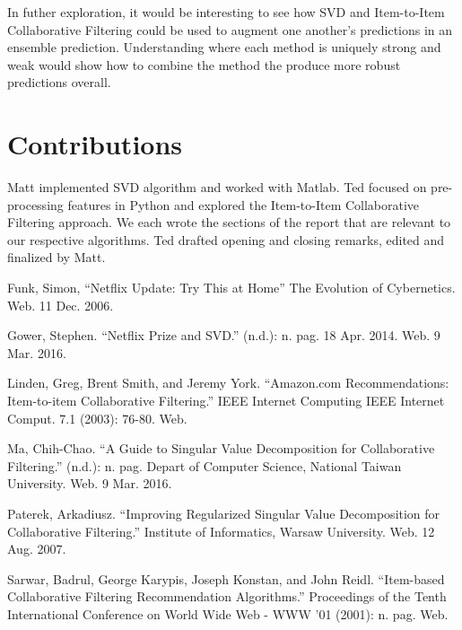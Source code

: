 \documentclass[12pt]{article}
\begin{document}
In futher exploration, it would be interesting to see how SVD and Item-to-Item Collaborative Filtering could be used to augment one another's predictions in an ensemble prediction. Understanding where each method is uniquely strong and weak would show how to combine the method the produce more robust predictions overall.

\section{Contributions}
Matt implemented SVD algorithm and worked with Matlab. Ted focused on pre-processing features in Python and explored the Item-to-Item Collaborative Filtering approach. We each wrote the sections of the report that are relevant to our respective algorithms. Ted drafted opening and closing remarks, edited and finalized by Matt.

\newpage
\begin{thebibliography}{9}

Funk, Simon, ``Netflix Update: Try This at Home'' The Evolution of Cybernetics. Web. 11 Dec. 2006.

Gower, Stephen. ``Netflix Prize and SVD.'' (n.d.): n. pag. 18 Apr. 2014. Web. 9 Mar. 2016.

Linden, Greg, Brent Smith, and Jeremy York. ``Amazon.com Recommendations: Item-to-item Collaborative Filtering.'' IEEE Internet Computing IEEE Internet Comput. 7.1 (2003): 76-80. Web.

Ma, Chih-Chao. ``A Guide to Singular Value Decomposition for Collaborative Filtering.'' (n.d.): n. pag. Depart of Computer Science, National Taiwan University. Web. 9 Mar. 2016.

Paterek, Arkadiusz. ``Improving Regularized Singular Value Decomposition for Collaborative Filtering.'' Institute of Informatics, Warsaw University. Web. 12 Aug. 2007.

Sarwar, Badrul, George Karypis, Joseph Konstan, and John Reidl. ``Item-based Collaborative Filtering Recommendation Algorithms.'' Proceedings of the Tenth International Conference on World Wide Web - WWW '01 (2001): n. pag. Web.

\end{thebibliography}
\end{document}
